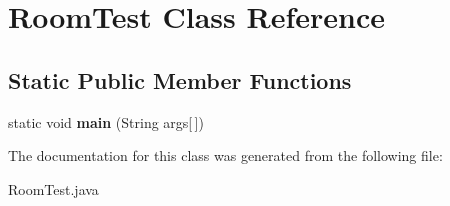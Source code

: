 \hypertarget{class_room_test}{}\section{Room\+Test Class Reference}
\label{class_room_test}
\subsection*{Static Public Member Functions}
\begin{DoxyCompactItemize}
\item 
\hypertarget{class_room_test_aaaf731386801063462f02a1d77f132d3}{}static void {\bfseries main} (String args\mbox{[}$\,$\mbox{]})\label{class_room_test_aaaf731386801063462f02a1d77f132d3}

\end{DoxyCompactItemize}


The documentation for this class was generated from the following file\+:\begin{DoxyCompactItemize}
\item 
Room\+Test.\+java\end{DoxyCompactItemize}
